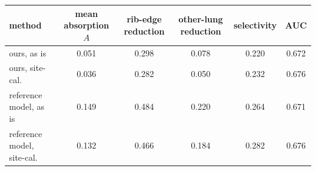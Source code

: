 \begin{tabular}{lccccc}
\toprule
method & mean absorption $A$ & rib-edge reduction & other-lung reduction & selectivity & AUC \\
\midrule
ours, as is & 0.051 & 0.298 & 0.078 & 0.220 & 0.672 \\
ours, site-cal. & 0.036 & 0.282 & 0.050 & 0.232 & 0.676 \\
reference model, as is & 0.149 & 0.484 & 0.220 & 0.264 & 0.671 \\
reference model, site-cal. & 0.132 & 0.466 & 0.184 & 0.282 & 0.676 \\
\bottomrule
\end{tabular}
